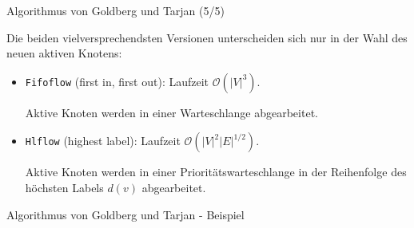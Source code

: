 \documentclass[aspectratio=169]{beamer}
\begin{document}
\begin{frame}{Algorithmus von Goldberg und Tarjan (5/5)}

  Die beiden vielversprechendsten Versionen unterscheiden sich
  nur in der Wahl des neuen aktiven Knotens:

  \begin{itemize}
    \item \texttt{Fifoflow} (first in, first out): Laufzeit $\mathcal{O}(|V|^3)$.
    
    Aktive Knoten werden in einer Warteschlange abgearbeitet.
      
    

    \item \texttt{Hlflow} (highest label): Laufzeit $\mathcal{O}(|V|^2|E|^{1/2})$.
    
    Aktive Knoten werden in einer Prioritätswarteschlange 
    in der Reihenfolge des höchsten Labels $d(v)$ abgearbeitet.
      
    
  \end{itemize} 
  
  
\end{frame}

\begin{frame}{Algorithmus von Goldberg und Tarjan - Beispiel}
  
\end{frame}
\end{document}
